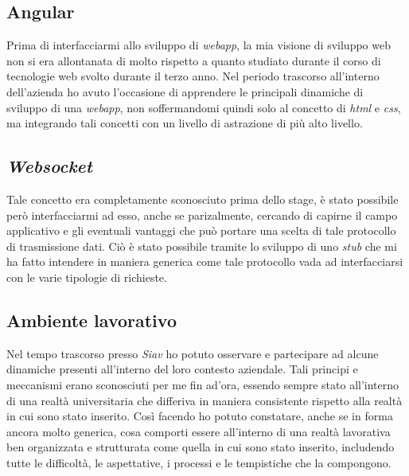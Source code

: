 \subsection{Angular}
Prima di interfacciarmi allo sviluppo di \textit{webapp}, la mia visione di sviluppo web non si era allontanata di molto rispetto a quanto studiato durante il corso di tecnologie web svolto durante il terzo anno. Nel periodo trascorso all'interno dell'azienda ho avuto l'occasione di apprendere le principali dinamiche di sviluppo di una \textit{webapp}, non soffermandomi quindi solo al concetto di \textit{html} e \textit{css}, ma integrando tali concetti con un livello di astrazione di più alto livello.
\subsection{\textit{Websocket}}
Tale concetto era completamente sconosciuto prima dello stage, è stato possibile però interfacciarmi ad esso, anche se parizalmente, cercando di capirne il campo applicativo e gli eventuali vantaggi che può portare una scelta di tale protocollo di trasmissione dati. Ciò è stato possibile tramite lo sviluppo di uno \textit{stub} che mi ha fatto intendere in maniera generica come tale protocollo vada ad interfacciarsi con le varie tipologie di richieste.
\subsection{Ambiente lavorativo}
Nel tempo trascorso presso \textit{Siav} ho potuto osservare e partecipare ad alcune dinamiche presenti all'interno del loro contesto aziendale. Tali principi e meccanismi erano sconosciuti per me fin ad'ora, essendo sempre stato all'interno di una realtà universitaria che differiva in maniera consistente rispetto alla realtà in cui sono stato inserito. Così facendo ho potuto constatare, anche se in forma ancora molto generica, cosa comporti essere all'interno di una realtà lavorativa ben organizzata e strutturata come quella in cui sono stato inserito, includendo tutte le difficoltà, le aspettative, i processi e le tempistiche che la compongono.
